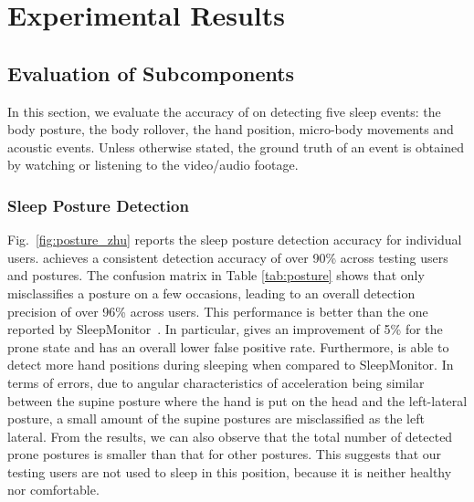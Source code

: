 \section{Experimental Results}\label{sec:4experiment}

\subsection{Evaluation of Subcomponents}
In this section, we evaluate the accuracy of \systemname on detecting five sleep events: the body posture, the body rollover, the hand
position, micro-body movements and acoustic events. Unless otherwise stated, the ground truth of an event is obtained by watching or
listening to the video/audio footage.



\subsubsection{Sleep Posture Detection}
\label{subsub:bodyposture} Fig.~\ref{fig:posture_zhu} reports the sleep posture detection accuracy for individual users. \systemname
achieves a consistent detection accuracy of over 90\% across testing users and postures. The confusion matrix in Table \ref{tab:posture}
shows that \systemname only misclassifies a posture on a few occasions, leading to an overall detection precision of over 96\% across
users. This performance is better than the one reported by SleepMonitor~\cite{sleepmonitor}. In particular, {\systemname} gives an
improvement of 5\% for the prone state and has an overall lower false positive rate. Furthermore, {\systemname} is able to detect more hand
positions during sleeping when compared to SleepMonitor. In terms of errors, due to angular characteristics of acceleration being similar
between the supine posture where the hand is put on the head and the left-lateral posture, a small amount of the supine postures are
misclassified as the left lateral. From the results, we can also observe that the total number of detected prone postures is smaller than
that for other postures. This suggests that our testing users are not used to sleep in this position, because it is neither healthy nor
comfortable.






